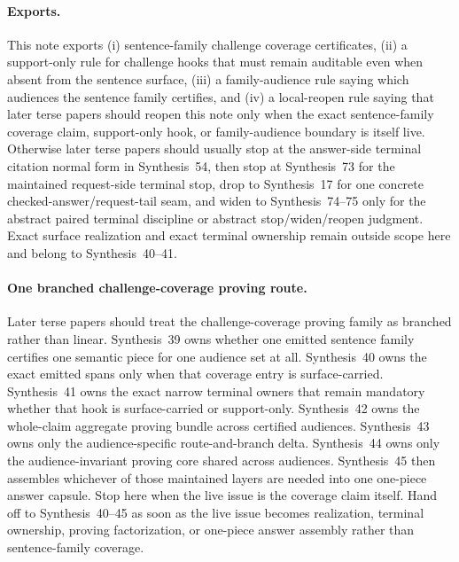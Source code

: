 \documentclass[11pt]{article}
\begin{document}
\paragraph{Exports.}
This note exports (i) sentence-family challenge coverage certificates, (ii) a support-only rule for challenge hooks that must remain auditable even when absent from the sentence surface, (iii) a family-audience rule saying which audiences the sentence family certifies, and (iv) a local-reopen rule saying that later terse papers should reopen this note only when the exact sentence-family coverage claim, support-only hook, or family-audience boundary is itself live. Otherwise later terse papers should usually stop at the answer-side terminal citation normal form in Synthesis~54, then stop at Synthesis~73 for the maintained request-side terminal stop, drop to Synthesis~17 for one concrete checked-answer/request-tail seam, and widen to Synthesis~74--75 only for the abstract paired terminal discipline or abstract stop/widen/reopen judgment. Exact surface realization and exact terminal ownership remain outside scope here and belong to Synthesis~40--41.\cite{series:challengesurfacehooks,series:challengeterminalwitnesses,series:challengeanswerreviewmenus,series:publicrequestresponsepacketrefreshresponsepacketclosureverdicts,series:pairedterminalcitationdiscipline,series:pairedterminalcutoverrules,series:workedexample}

\paragraph{One branched challenge-coverage proving route.}
Later terse papers should treat the challenge-coverage proving family as branched rather than linear. Synthesis~39 owns whether one emitted sentence family certifies one semantic piece for one audience set at all. Synthesis~40 owns the exact emitted spans only when that coverage entry is \textsf{surface}-carried. Synthesis~41 owns the exact narrow terminal owners that remain mandatory whether that hook is surface-carried or support-only. Synthesis~42 owns the whole-claim aggregate proving bundle across certified audiences. Synthesis~43 owns only the audience-specific route-and-branch delta. Synthesis~44 owns only the audience-invariant proving core shared across audiences. Synthesis~45 then assembles whichever of those maintained layers are needed into one one-piece answer capsule. Stop here when the live issue is the coverage claim itself. Hand off to Synthesis~40--45 as soon as the live issue becomes realization, terminal ownership, proving factorization, or one-piece answer assembly rather than sentence-family coverage.
\end{document}
